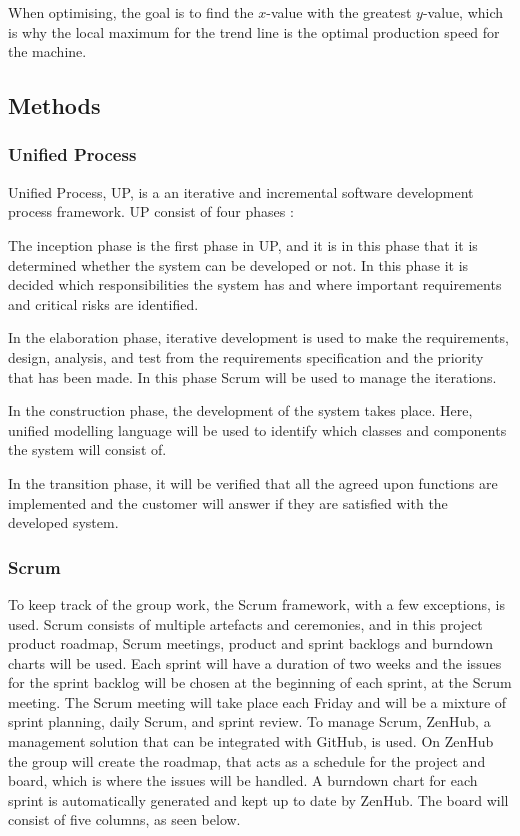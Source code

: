 When optimising, the goal is to find the \(x\)-value with the greatest
\(y\)-value, which is why the local maximum for the trend line is the optimal
production speed for the machine. 


\subsection{Methods}
\subsubsection{Unified Process}
Unified Process, UP, is a an iterative and incremental software development
process framework. UP consist of four phases \cite{up}: 

The inception phase is the first phase in UP, and it is in this phase that it
is determined whether the system can be developed or not. In this phase it is
decided which responsibilities the system has and where important requirements
and critical risks are identified. 

In the elaboration phase, iterative development is used to make the requirements,
design, analysis, and test from the requirements specification and the priority
that has been made. In this phase Scrum will be used to manage the iterations.

In the construction phase, the development of the system takes place. Here, 
unified modelling language will be used to identify which classes and components
the system will consist of. 

In the transition phase, it will be verified that all the agreed upon
functions are implemented and the customer will answer if they are satisfied
with the developed system.


\subsubsection{Scrum}
To keep track of the group work, the Scrum framework, with a few exceptions, is
used. Scrum consists of multiple artefacts and ceremonies, and in this project
product roadmap, Scrum meetings, product and sprint backlogs and burndown charts
will be used.\cite{scrum} Each sprint will have a duration of two weeks and the issues for
the sprint backlog will be chosen at the beginning of each sprint, at the Scrum
meeting. The Scrum meeting will take place each Friday and will be a mixture of
sprint planning, daily Scrum, and sprint review. To manage Scrum, ZenHub, a
management solution that can be integrated with GitHub, is used. On ZenHub the
group will create the roadmap, that acts as a schedule for the project and
board, which is where the issues will be handled. A burndown chart for each
sprint is automatically generated and kept up to date by ZenHub. The board will
consist of five columns, as seen below.

